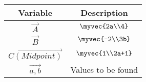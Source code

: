 \begin{tabular}[12pt]{ |c| c|}
    \hline
    \textbf{Variable} & \textbf{Description}\\ 
    \hline
	$\vec{A}$ & $\myvec{2a\\4}$\\
	\hline
	$\vec{B}$ & $\myvec{-2\\3b}$\\
	\hline
	$\vec{C(Midpoint)}$ & $\myvec{1\\2a+1}$\\
	\hline
	$\vec{a,b}$ & Values to be found\\
\end{tabular}
